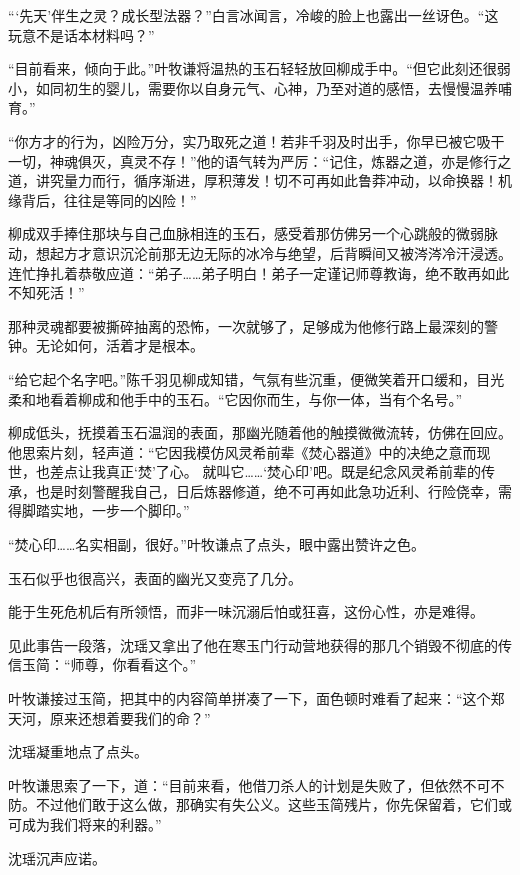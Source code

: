 “‘先天’伴生之灵？成长型法器？”白言冰闻言，冷峻的脸上也露出一丝讶色。“这玩意不是话本材料吗？”

“目前看来，倾向于此。”叶牧谦将温热的玉石轻轻放回柳成手中。“但它此刻还很弱小，如同初生的婴儿，需要你以自身元气、心神，乃至对道的感悟，去慢慢温养哺育。”

“你方才的行为，凶险万分，实乃取死之道！若非千羽及时出手，你早已被它吸干一切，神魂俱灭，真灵不存！”他的语气转为严厉：“记住，炼器之道，亦是修行之道，讲究量力而行，循序渐进，厚积薄发！切不可再如此鲁莽冲动，以命换器！机缘背后，往往是等同的凶险！”

柳成双手捧住那块与自己血脉相连的玉石，感受着那仿佛另一个心跳般的微弱脉动，想起方才意识沉沦前那无边无际的冰冷与绝望，后背瞬间又被涔涔冷汗浸透。连忙挣扎着恭敬应道：“弟子……弟子明白！弟子一定谨记师尊教诲，绝不敢再如此不知死活！”

那种灵魂都要被撕碎抽离的恐怖，一次就够了，足够成为他修行路上最深刻的警钟。无论如何，活着才是根本。

“给它起个名字吧。”陈千羽见柳成知错，气氛有些沉重，便微笑着开口缓和，目光柔和地看着柳成和他手中的玉石。“它因你而生，与你一体，当有个名号。”

柳成低头，抚摸着玉石温润的表面，那幽光随着他的触摸微微流转，仿佛在回应。他思索片刻，轻声道：“它因我模仿风灵希前辈《焚心器道》中的决绝之意而现世，也差点让我真正‘焚’了心。 就叫它……‘焚心印’吧。既是纪念风灵希前辈的传承，也是时刻警醒我自己，日后炼器修道，绝不可再如此急功近利、行险侥幸，需得脚踏实地，一步一个脚印。”

“焚心印……名实相副，很好。”叶牧谦点了点头，眼中露出赞许之色。

玉石似乎也很高兴，表面的幽光又变亮了几分。

能于生死危机后有所领悟，而非一味沉溺后怕或狂喜，这份心性，亦是难得。

\vspace{2em}

见此事告一段落，沈瑶又拿出了他在寒玉门行动营地获得的那几个销毁不彻底的传信玉简：“师尊，你看看这个。”

叶牧谦接过玉简，把其中的内容简单拼凑了一下，面色顿时难看了起来：“这个郑天河，原来还想着要我们的命？”

沈瑶凝重地点了点头。

叶牧谦思索了一下，道：“目前来看，他借刀杀人的计划是失败了，但依然不可不防。不过他们敢于这么做，那确实有失公义。这些玉简残片，你先保留着，它们或可成为我们将来的利器。”

沈瑶沉声应诺。

\vspace{2em}

